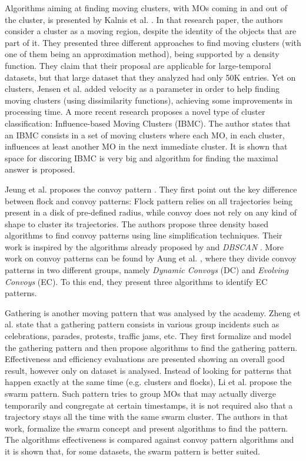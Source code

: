 Algorithms aiming at finding moving clusters, with MOs coming in and out of the cluster, is presented by Kalnis et al.
\citep{movingclusters}. In that research paper, the authors consider a cluster as a moving region, despite the identity
of the objects that are part of it. They presented three different approaches to find moving clusters (with one of them
being an approximation method), being supported by a density function. They claim that their proposal are applicable for
large-temporal datasets, but that large dataset that they analyzed had only 50K entries. Yet on clusters, Jensen et
al. \citep{clusters3} added velocity as a parameter in order to help finding moving clusters (using dissimilarity
functions), achieving some improvements in processing time. A more recent research \citep{clusters1} proposes a novel
type of cluster classification: Influence-based Moving Clusters (IBMC). The author states that an IBMC consists in a set
of moving clusters where each MO, in each cluster, influences at least another MO in the next immediate cluster. It is
shown that space for discoring IBMC is very big and algorithm for finding the maximal answer is proposed.

Jeung et al. proposes the convoy pattern \citep{convoy2}\citep{convoy}. They first point out the key difference between
flock and convoy patterns: Flock pattern relies on all trajectories being present in a disk of pre-defined radius, while
convoy does not rely on any kind of shape to cluster its trajectories. The authors propose three density based
algorithms to find convoy patterns using line simplification techniques. Their work is inspired by the algorithms
already proposed by \citep{movingclusters} and \textit{DBSCAN} \citep{dbscan}. More work on convoy patterns can be found
by Aung et al. \citep{convoy3}, where they divide convoy patterns in two different groups, namely \textit{Dynamic
Convoys} (DC) and \textit{Evolving Convoys} (EC). To this end, they present three algorithms to identify EC patterns.

Gathering is another moving pattern that was analysed by the academy. Zheng et al. \citep{gathering} state that a
gathering pattern consists in various group incidents such as celebrations, parades, protests, traffic jams, etc. They
first formalize and model the gathering pattern and then propose algorithms to find the gathering pattern. Effectiveness
and efficiency evaluations are presented showing an overall good result, however only on dataset is analysed. Instead of
looking for patterns that happen exactly at the same time (e.g. clusters and flocks), Li et al. \citep{swarm} propose
the swarm pattern. Such pattern tries to group MOs that may actually diverge temporarily and congregate at certain
timestamps, it is not required also that a trajectory stays all the time with the same swarm cluster. The authors in
that work, formalize the swarm concept and present algorithms to find the pattern. The algorithms effectiveness is
compared against convoy pattern algorithms and it is shown that, for some datasets, the swarm pattern is better suited.

